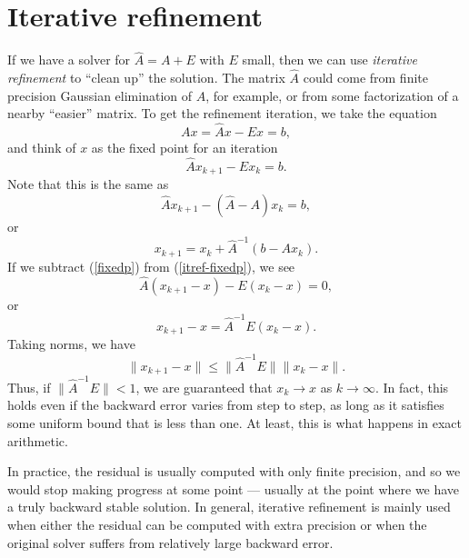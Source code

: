 \section{Iterative refinement}

If we have a solver for $\hat{A} = A + E$ with $E$ small, then we can
use {\em iterative refinement} to ``clean up'' the solution.  The
matrix $\hat{A}$ could come from finite precision Gaussian elimination
of $A$, for example, or from some factorization of a nearby ``easier''
matrix.  To get the refinement iteration, we take the equation
\begin{equation} \label{fixedp}
  Ax = \hat{A}x-Ex = b,
\end{equation}
and think of $x$ as the fixed point for an iteration
\begin{equation} \label{itref-fixedp}
  \hat{A} x_{k+1} - E x_k = b.
\end{equation}
Note that this is the same as
\[
  \hat{A} x_{k+1} - (\hat{A} - A) x_k = b,
\]
or
\[
  x_{k+1} = x_k + \hat{A}^{-1} (b - A x_{k}).
\]
If we subtract (\ref{fixedp}) from (\ref{itref-fixedp}), we see
\[
  \hat{A}(x_{k+1}-x) - E(x_k-x) = 0,
\]
or
\[
  x_{k+1}-x = \hat{A}^{-1} E (x_k-x).
\]
Taking norms, we have
\[
  \|x_{k+1}-x\| \leq \|\hat{A}^{-1} E\| \|x_k-x\|.
\]
Thus, if $\|\hat{A}^{-1} E\| < 1$, we are guaranteed that $x_{k} \rightarrow x$
as $k \rightarrow \infty$.  In fact, this holds even if the backward error
varies from step to step, as long as it satisfies some uniform bound that is
less than one.  At least, this is what happens in exact arithmetic.

In practice, the residual is usually computed with only finite precision,
and so we would stop making progress at some point --- usually at
the point where we have a truly backward stable solution.  In general,
iterative refinement is mainly used when either the residual can be
computed with extra precision or when the original solver suffers from
relatively large backward error.
